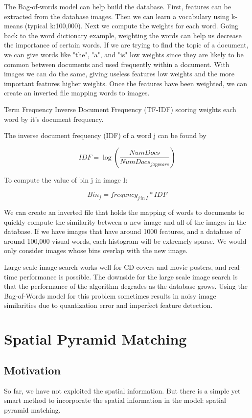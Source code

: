 \documentclass{article}
\begin{document}
The Bag-of-words model can help build the database.  First, features can be extracted from the database images. Then we can learn a vocabulary using k-means (typical k:100,000).  Next we compute the weights for each word.  Going back to the word dictionary example, weighting the words can help us decrease the importance of certain words.  If we are trying to find the topic of a document, we can give words like "the", "a", and "is" low weights since they are likely to be common between documents and used frequently within a document.  With images we can do the same, giving useless features low weights and the more important features higher weights.  Once the features have been weighted, we can create an inverted file mapping words to images.

Term Frequency Inverse Document Frequency (TF-IDF) scoring weights each word by it's document frequency.  

The inverse document frequency (IDF) of a word j can be found by

$$IDF = \log(\frac{NumDocs}{NumDocs_{j appears}})$$

To compute the value of bin j in image I:

$$Bin_{j} = frequncy_{j\,in\,I} * IDF$$

We can create an inverted file that holds the mapping of words to documents to quickly compute the similarity between a new image and all of the images in the database. If we have images that have around 1000 features, and a database of around 100,000 visual words, each histogram will be extremely sparse.  We would only consider images whose bins overlap with the new image.

Large-scale image search works well for CD covers and movie posters, and real-time performance is possible. The downside for the large scale image search is that the performance of the algorithm degrades as the database grows. Using the Bag-of-Words model for this problem sometimes results in noisy image similarities due to quantization error and imperfect feature detection.\cite{Large-scale-collections}
\section{Spatial Pyramid Matching}
\subsection{Motivation}
So far, we have not exploited the spatial information. But there is a simple yet smart method to incorporate the spatial information in the model: spatial pyramid matching.
\end{document}
